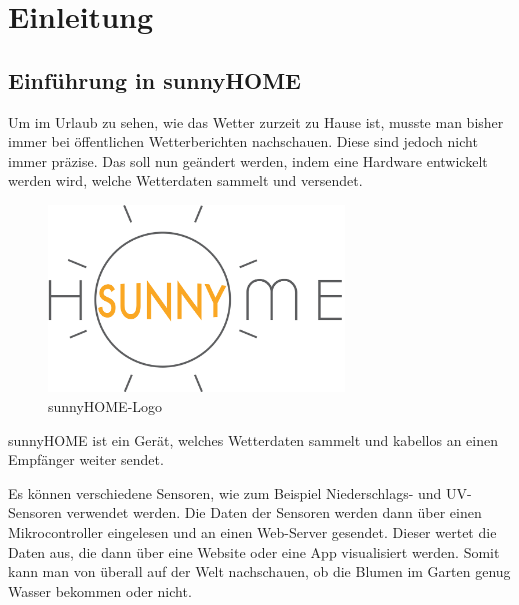 

\chapter{Einleitung}


\section{Einführung in sunnyHOME}
    
    Um im Urlaub zu sehen, wie das Wetter zurzeit zu Hause ist, musste man bisher immer bei öffentlichen Wetterberichten nachschauen. Diese sind jedoch nicht immer präzise. Das soll nun geändert werden, indem eine Hardware entwickelt werden wird, welche Wetterdaten sammelt und versendet.

    \begin{figure}[H]
        \centering
        \includegraphics[width=0.7\textwidth]{./media/images/sunnyHOME.png}
        \caption{sunnyHOME-Logo}
        \label{fig:Logo}
    \end{figure}
    
    sunnyHOME ist ein Gerät, welches Wetterdaten sammelt und kabellos an einen Empfänger weiter sendet. 
    
    Es können verschiedene Sensoren, wie zum Beispiel Niederschlags- und UV-Sensoren verwendet werden. Die Daten der Sensoren werden dann über einen Mikrocontroller eingelesen und an einen Web-Server gesendet. Dieser wertet die Daten aus, die dann über eine Website oder eine App visualisiert werden. Somit kann man von überall auf der Welt nachschauen, ob die Blumen im Garten genug Wasser bekommen oder nicht.  

